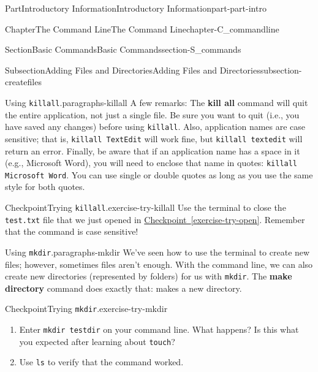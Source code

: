 \documentclass[oneside,10pt,]{book}
\newcommand{\xreffont}{\relax}
\newcommand{\mono}[1]{\texttt{#1}}
\newcommand{\terminology}[1]{\textbf{#1}}
\begin{document}
\begin{partptx}{Part}{Introductory Information}{}{Introductory Information}{}{}{part-part-intro}
\begin{chapterptx}{Chapter}{The Command Line}{}{The Command Line}{}{}{chapter-C_commandline}
\begin{sectionptx}{Section}{Basic Commands}{}{Basic Commands}{}{}{section-S_commands}
\begin{subsectionptx}{Subsection}{Adding Files and Directories}{}{Adding Files and Directories}{}{}{subsection-createfiles}
\begin{paragraphs}{Using \mono{killall}.}{paragraphs-killall}
A few remarks: The \terminology{kill all} command will quit the entire application, not just a single file. Be sure you want to quit (i.e., you have saved any changes) before using \mono{killall}. Also, application names are case sensitive; that is, \mono{killall TextEdit} will work fine, but \mono{killall textedit} will return an error. Finally, be aware that if an application name has a space in it (e.g.\@, Microsoft Word), you will need to enclose that name in quotes: \mono{killall \textquotesingle{}Microsoft Word\textquotesingle{}}. You can use single or double quotes as long as you use the same style for both quotes.%
\begin{inlineexercise}{Checkpoint}{Trying \mono{killall}.}{exercise-try-killall}%
Use the terminal to close the \mono{test.txt} file that we just opened in \hyperref[exercise-try-open]{Checkpoint~{\xreffont\ref{exercise-try-open}}}. Remember that the command is case sensitive!%
\end{inlineexercise}%
\end{paragraphs}%
\begin{paragraphs}{Using \mono{mkdir}.}{paragraphs-mkdir}%
\index{\mono{mkdir}}%
%
\index{command line!\mono{mkdir}}%
We've seen how to use the terminal to create new files; however, sometimes files aren't enough. With the command line, we can also create new directories (represented by folders) for us with \mono{mkdir}. The \terminology{make directory} command does exactly that: makes a new directory.%
\begin{inlineexercise}{Checkpoint}{Trying \mono{mkdir}.}{exercise-try-mkdir}%
\begin{enumerate}[font=\bfseries,label=(\alph*),ref=\alph*]%
\item{}Enter \mono{mkdir testdir} on your command line. What happens? Is this what you expected after learning about \mono{touch}?%
\item{}Use \mono{ls} to verify that the command worked.%
\end{enumerate}%
\end{inlineexercise}%

\end{paragraphs}
\end{subsectionptx}
\end{sectionptx}
\end{chapterptx}
\end{partptx}
\end{document}
